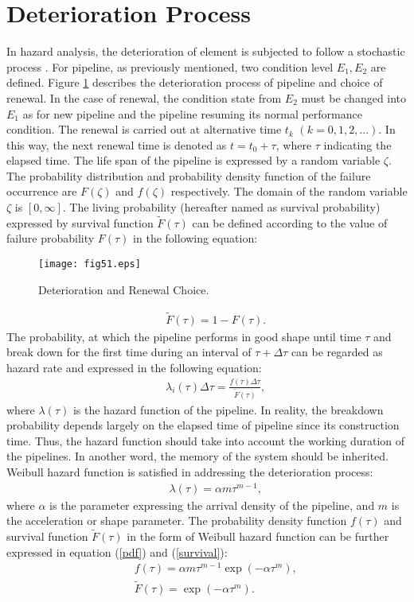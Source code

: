 \section{Deterioration Process}
\label{54}
In hazard analysis, the deterioration of element is subjected to follow a stochastic process \cite{lancaster90}. For pipeline, as previously mentioned, two condition level $E_1, E_2$ are defined. Figure \ref{fig51} describes the deterioration process of pipeline and choice of renewal. In the case of renewal, the condition state from $E_2$ must be changed into $E_1$ as for new pipeline and the pipeline resuming its normal performance condition. The renewal is carried out at alternative time $t_k$ $(k=0,1,2,...)$. In this way, the next renewal time is denoted as $t=t_0+\tau$, where $\tau$ indicating the elapsed time. The life span of the pipeline is expressed by a random variable $\zeta$. The probability distribution and probability density function of the failure occurrence are $F(\zeta)$ and $f(\zeta)$ respectively. The domain of the random variable $\zeta$ is $[0,\infty]$. The living probability (hereafter named as survival probability) expressed by survival function $\tilde{F}(\tau)$ can be defined according to the value of failure probability $F(\tau)$ in the following equation:
\begin{figure}[t]
\begin{center}
\texttt{[image: fig51.eps]}
\end{center}
\caption{Deterioration and Renewal Choice.}
\label{fig51} 
\end{figure}
\begin{eqnarray}
&& \tilde{F}(\tau) = 1 - F(\tau). \label{funcbF5}
\end{eqnarray}
The probability, at which the pipeline performs in good shape until time $\tau$ and break down for the first time during an interval of $\tau+\Delta\tau$ can be regarded as hazard rate and expressed in the following equation:
\begin{eqnarray}
&& \lambda_i(\tau) \Delta \tau = \frac{f(\tau)\Delta \tau}{\tilde{F}(\tau)}, \label{riskbF5}
\end{eqnarray}
where $\lambda(\tau)$ is the hazard function of the pipeline. In reality, the breakdown probability depends largely on the elapsed time of pipeline since its construction time. Thus, the hazard function should take into account the working duration of the pipelines. In another word, the memory of the system should be inherited. Weibull hazard function is satisfied in addressing the deterioration process:
\begin{eqnarray}
&& \lambda(\tau)= \alpha m \tau^{m-1}, \label{weibul}
\end{eqnarray}
where $\alpha$ is the parameter expressing the arrival density of the pipeline, and $m$ is the acceleration or shape parameter. The probability density function $f(\tau)$ and survival function $\tilde{F}(\tau)$ in the form of Weibull hazard function can be further expressed in equation (\ref{pdf}) and (\ref{survival}):
\begin{eqnarray}
&& f(\tau)=\alpha m\tau^{m-1}\exp(-\alpha \tau^m), \label{pdf} \\
&& \tilde{F}(\tau)=\exp(-\alpha \tau^m). \label{survival}
\end{eqnarray}
